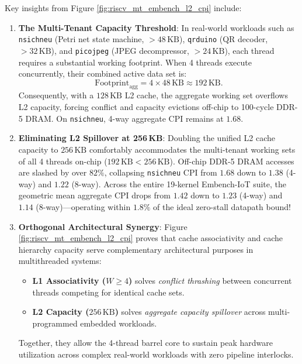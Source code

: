 Key insights from Figure \ref{fig:riscv_mt_embench_l2_cpi} include:
\begin{enumerate}
    \item \textbf{The Multi-Tenant Capacity Threshold}:
    In real-world workloads such as \texttt{nsichneu} (Petri net state machine, $>48\,\text{KB}$), \texttt{qrduino} (QR decoder, $>32\,\text{KB}$), and \texttt{picojpeg} (JPEG decompressor, $>24\,\text{KB}$), each thread requires a substantial working footprint. When 4 threads execute concurrently, their combined active data set is:
    \begin{equation}
    \text{Footprint}_{\text{agg}} = 4 \times 48\,\text{KB} \approx 192\,\text{KB}.
    \end{equation}
    Consequently, with a $128\,\text{KB}$ L2 cache, the aggregate working set overflows L2 capacity, forcing conflict and capacity evictions off-chip to 100-cycle DDR-5 DRAM. On \texttt{nsichneu}, 4-way aggregate CPI remains at $1.68$.
    \item \textbf{Eliminating L2 Spillover at 256\,KB}:
    Doubling the unified L2 cache capacity to $256\,\text{KB}$ comfortably accommodates the multi-tenant working sets of all 4 threads on-chip ($192\,\text{KB} < 256\,\text{KB}$). Off-chip DDR-5 DRAM accesses are slashed by over $82\%$, collapsing \texttt{nsichneu} CPI from $1.68$ down to $\mathbf{1.38}$ (4-way) and $\mathbf{1.22}$ (8-way). Across the entire 19-kernel Embench-IoT suite, the geometric mean aggregate CPI drops from $1.42$ down to $\mathbf{1.23}$ (4-way) and $\mathbf{1.14}$ (8-way)---operating within $\mathbf{1.8\%}$ of the ideal zero-stall datapath bound!
    \item \textbf{Orthogonal Architectural Synergy}:
    Figure \ref{fig:riscv_mt_embench_l2_cpi} proves that cache associativity and cache hierarchy capacity serve complementary architectural purposes in multithreaded systems:
    \begin{itemize}
        \item \textbf{L1 Associativity ($W \ge 4$)} solves \emph{conflict thrashing} between concurrent threads competing for identical cache sets.
        \item \textbf{L2 Capacity ($256\,\text{KB}$)} solves \emph{aggregate capacity spillover} across multi-programmed embedded workloads.
    \end{itemize}
    Together, they allow the 4-thread barrel core to sustain peak hardware utilization across complex real-world workloads with zero pipeline interlocks.
\end{enumerate}


